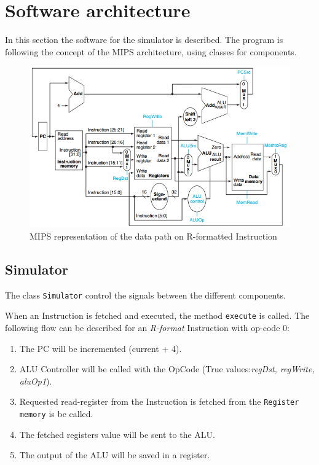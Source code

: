 \section{Software architecture}

In this section the software for the simulator is described. The
program is following the concept of the MIPS architecture, using
classes for components.

\begin{figure}[h]
    \centering
    \includegraphics[scale=0.6]{datapath-r-format}
    \caption{MIPS representation\cite{Patterson:2008:COD:1502247} of the data path on R-formatted Instruction}
    \label{fig:datapathBranchOnEqual}
\end{figure}

\subsection{Simulator}
The class \texttt{Simulator} control the signals between the different components.

When an Instruction is fetched and executed, the method
\texttt{execute} is called. The following flow can be described for an
\emph{R-format} Instruction with op-code 0:


\begin{enumerate}
\item The PC will be incremented (current + 4).
\item ALU Controller will be called with the OpCode (True values:\emph{regDst, regWrite, aluOp1}).
\item Requested read-register from the Instruction is fetched from the \texttt{Register memory} is be called.
\item The fetched registers value will be sent to the ALU.
\item The output of the ALU will be saved in a register.
\end{enumerate}

